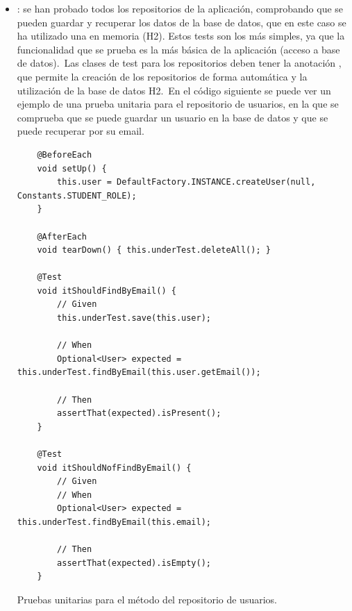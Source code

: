 \begin{itemize}
	\item {}: se han probado todos los repositorios de la aplicación, comprobando que se pueden
	guardar y recuperar los datos de la base de datos, que en este caso se ha utilizado una en memoria (H2).
	Estos tests son los más simples, ya que la funcionalidad
	que se prueba es la más básica de la aplicación (acceso a base de datos).\ Las clases de test para los
	repositorios deben tener la anotación , que permite la creación de los repositorios
	de forma automática y la utilización de la base de datos H2.\ En el código siguiente se puede
	ver un ejemplo de una prueba unitaria para el repositorio de usuarios, en la que se comprueba que se puede
	guardar un usuario en la base de datos y que se puede recuperar por su email.
	\begin{codeBlock}
		\begin{verbatim}
	@BeforeEach
	void setUp() {
		this.user = DefaultFactory.INSTANCE.createUser(null, Constants.STUDENT_ROLE);
	}

	@AfterEach
	void tearDown() { this.underTest.deleteAll(); }

	@Test
	void itShouldFindByEmail() {
		// Given
		this.underTest.save(this.user);

		// When
		Optional<User> expected = this.underTest.findByEmail(this.user.getEmail());

		// Then
		assertThat(expected).isPresent();
	}

	@Test
	void itShouldNofFindByEmail() {
		// Given
		// When
		Optional<User> expected = this.underTest.findByEmail(this.email);

		// Then
		assertThat(expected).isEmpty();
	}
		\end{verbatim}
		\caption{Pruebas unitarias para el método  del repositorio de usuarios.}
		\label{code:pruebas-unitarias-repositorio-usuarios}
	\end{codeBlock}


\end{itemize}
